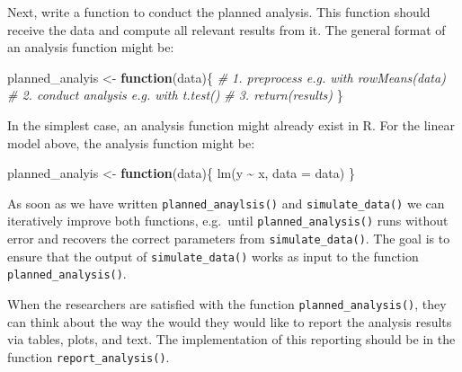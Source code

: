 \documentclass[psych,tutorial,accept,moreauthors,pdftex]{Definitions/mdpi}
\newenvironment{Shaded}{\begin{snugshade}}{\end{snugshade}}
\newcommand{\AttributeTok}[1]{\textcolor[rgb]{0.77,0.63,0.00}{#1}}
\newcommand{\CommentTok}[1]{\textcolor[rgb]{0.56,0.35,0.01}{\textit{#1}}}
\newcommand{\ControlFlowTok}[1]{\textcolor[rgb]{0.13,0.29,0.53}{\textbf{#1}}}
\newcommand{\FunctionTok}[1]{\textcolor[rgb]{0.00,0.00,0.00}{#1}}
\newcommand{\NormalTok}[1]{#1}
\newcommand{\OtherTok}[1]{\textcolor[rgb]{0.56,0.35,0.01}{#1}}
\newcommand{\SpecialCharTok}[1]{\textcolor[rgb]{0.00,0.00,0.00}{#1}}
\begin{document}
\begin{paracol}{2}
\switchcolumn


Next, write a function to conduct the planned analysis. This function
should receive the data and compute all relevant results from it. The
general format of an analysis function might be:

\begin{adjustwidth}{0.5cm}{0cm} 
\begin{Shaded}
\begin{Highlighting}[]
\NormalTok{planned\_analyis }\OtherTok{\textless{}{-}} \ControlFlowTok{function}\NormalTok{(data)\{}
  \CommentTok{\# 1. preprocess e.g. with \textasciigrave{}rowMeans(data)\textasciigrave{}}
  \CommentTok{\# 2. conduct analysis e.g. with \textasciigrave{}t.test()\textasciigrave{}}
  \CommentTok{\# 3. \textasciigrave{}return(results)\textasciigrave{}}
\NormalTok{\}}
\end{Highlighting}
\end{Shaded}
\end{adjustwidth}

In the simplest case, an analysis function might already exist in R. For
the linear model above, the analysis function might be:

\begin{adjustwidth}{0.5cm}{0cm} 
\begin{Shaded}
\begin{Highlighting}[]
\NormalTok{planned\_analyis }\OtherTok{\textless{}{-}} \ControlFlowTok{function}\NormalTok{(data)\{}
    \FunctionTok{lm}\NormalTok{(y }\SpecialCharTok{\textasciitilde{}}\NormalTok{ x, }\AttributeTok{data =}\NormalTok{ data)}
\NormalTok{\}}
\end{Highlighting}
\end{Shaded}
\end{adjustwidth}

As soon as we have written \texttt{planned\_anaylsis()} and
\texttt{simulate\_data()} we can iteratively improve both functions,
e.g.~until \texttt{planned\_analysis()} runs without error and recovers
the correct parameters from \texttt{simulate\_data()}. The goal is to
ensure that the output of \texttt{simulate\_data()} works as input to
the function \texttt{planned\_analysis()}.

When the researchers are satisfied with the function
\texttt{planned\_analysis()}, they can think about the way the would
they would like to report the analysis results via tables, plots, and
text. The implementation of this reporting should be in the function
\texttt{report\_analysis()}.

\newpage
\end{paracol}
\end{document}
